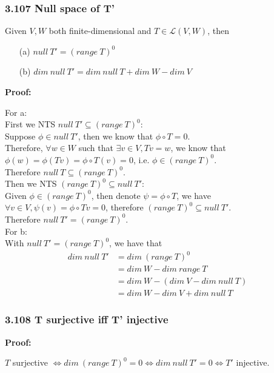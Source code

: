 \documentclass{article}
\begin{document}
\subsubsection*{3.107 Null space of T'}
Given $V, W$ both finite-dimensional and $T \in \mathcal{L}(V, W)$, then
\begin{itemize}
    \item[(a)] $null\ T' = (range\ T)^0$
    \item[(b)] $dim\ null\ T' = dim\ null\ T + dim\ W - dim\ V$
\end{itemize}
\textbf{Proof:}
\begin{addmargin}[1em]{0em}
    For a:\\
    First we NTS $null\ T' \subseteq (range\ T)^0$:\\
    Suppose $\phi \in null\ T'$, then we know that $\phi \circ T = 0$.\\
    Therefore, $\forall w \in W$ such that $\exists v \in V, Tv = w$, we know that $\phi(w) = \phi(Tv) = \phi \circ T(v) = 0$, i.e. $\phi \in (range\ T)^0$.\\
    Therefore $null\ T \subseteq (range\ T)^0$.\\
    Then we NTS $(range\ T)^0 \subseteq null\ T'$:\\
    Given $\phi \in (range\ T)^0$, then denote $\psi = \phi \circ T$, we have $\forall v \in V, \psi(v) = \phi \circ Tv = 0$, therefore $(range\ T)^0 \subseteq null\ T'$.\\
    Therefore $null\ T' = (range\ T)^0$.\\
    For b:\\
    With $null\ T' = (range\ T)^0$, we have that
    \begin{equation*}
        \begin{split}
            dim\ null\ T' &= dim\ (range\ T)^0\\
            &= dim\ W - dim\ range\ T\\
            &= dim\ W - (dim\ V - dim\ null\ T)\\
            &= dim\ W - dim\ V + dim\ null\ T
        \end{split}
    \end{equation*}
\end{addmargin}
\subsubsection*{3.108 T surjective iff T' injective}
\textbf{Proof:}
\begin{addmargin}[1em]{0em}
    $T$ surjective $\iff dim\ (range\ T)^0 = 0 \iff dim\ null\ T' = 0 \iff T'$  injective.
\end{addmargin}
\end{document}

